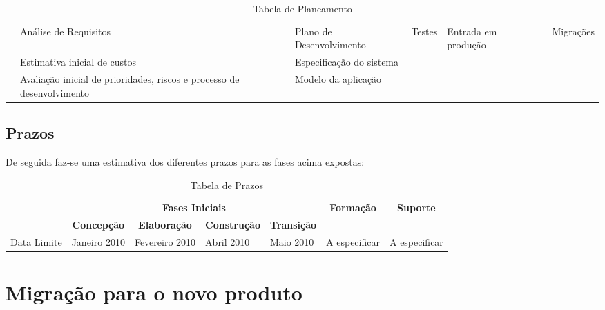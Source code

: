 \begin{sidewaystable}[!p]
\begin{center}
\begin{tabular}{|p{1cm}|p{1.2cm}|p{1.2cm}|p{1.2cm}|p{1.2cm}|p{1.2cm}|p{1.2cm}|p{1.2cm}|p{1.2cm}|p{2.4cm}|p{2.4cm}|}
\cline{2-11}\T \B & \multicolumn{2}{|p{2cm}|}{Análise de Requisitos} & \multicolumn{2}{|p{2cm}|}{Plano de Desenvolvimento} & \multicolumn{2}{|p{2cm}|}{Testes} & \multicolumn{2}{|p{2cm}|}{Entrada em produção} & & Migrações\\
\cline{2-11}\T \B & \multicolumn{2}{|p{2cm}|}{Estimativa inicial de custos} & \multicolumn{2}{|p{2cm}|}{Especificação do sistema} & \multicolumn{2}{|p{2cm}|}{ } & \multicolumn{2}{|p{2cm}|}{ } & & \\
\cline{2-11}\T \B & \multicolumn{2}{|p{2cm}|}{Avaliação inicial de prioridades, riscos e processo de desenvolvimento} & \multicolumn{2}{|p{2cm}|}{Modelo da aplicação} & \multicolumn{2}{|p{2cm}|}{ } & \multicolumn{2}{|p{2cm}|}{ } & & \\
 \hline
\end{tabular}
 \caption{Tabela de Planeamento}
\end{center}
\end{sidewaystable}
\clearpage
\subsection{Prazos}
De seguida faz-se uma estimativa dos diferentes prazos para as fases acima expostas:

\begin{table}[!h]
\begin{center}
\setlength{\tabcolsep}{2pt}
\begin{tabular}{|p{1.5cm}|p{1.5cm}|p{1.5cm}|p{1.5cm}|p{1.5cm}|p{2.2cm}|p{2.2cm}|}
\hline & \multicolumn{4}{|c|}{\T \B \textbf{Fases Iniciais}} & \multicolumn{1}{|c|}{\textbf{Formação}} & \multicolumn{1}{|c|}{\textbf{Suporte}}\\
\cline{2-5} & \multicolumn{1}{|c|}{ \T \B \textbf{Concepção}} & \multicolumn{1}{|c|}{\textbf{Elaboração}} & \multicolumn{1}{|c|}{\textbf{Construção}} & \multicolumn{1}{|c|}{\textbf{Transição}} & \multicolumn{1}{|c|}{\textbf{ }} & \multicolumn{1}{|c|}{\textbf{ }}\\
\hline \T \B Data Limite & Janeiro 2010 & Fevereiro 2010 & Abril 2010 & Maio 2010 & A especificar & A especificar\\
 \hline
\end{tabular}
 \caption{Tabela de Prazos}
\end{center}
\end{table}

\section{Migração para o novo produto}
